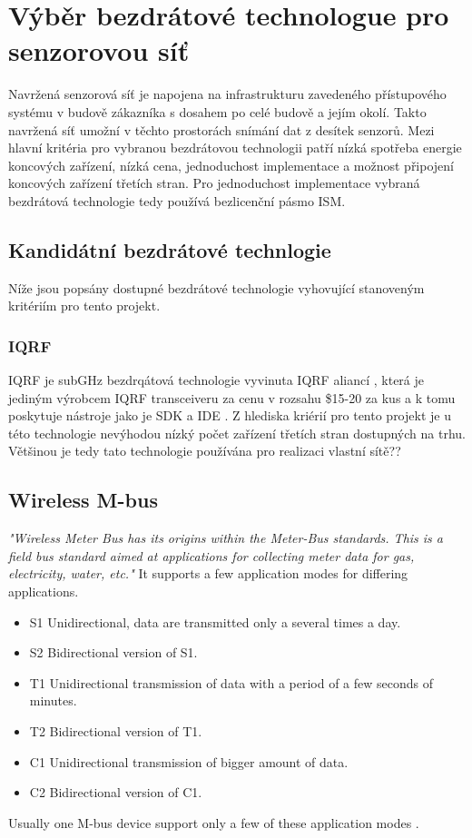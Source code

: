 \chapter{Výběr bezdrátové technologue pro senzorovou síť}
Navržená senzorová síť je napojena na infrastrukturu zavedeného přístupového systému v budově zákazníka s dosahem po celé budově a jejím okolí. Takto navržená síť umožní v těchto prostorách snímání dat z desítek senzorů.
Mezi hlavní kritéria pro vybranou bezdrátovou technologii patří nízká spotřeba energie koncových zařízení, nízká cena, jednoduchost implementace a možnost připojení koncových zařízení třetích stran.
Pro jednoduchost implementace vybraná bezdrátová technologie tedy používá bezlicenční pásmo ISM. 

\section{Kandidátní bezdrátové technlogie}
Níže jsou popsány dostupné bezdrátové technologie vyhovující stanoveným kritériím pro tento projekt.

\subsection{IQRF}
IQRF je subGHz bezdrqátová technologie vyvinuta IQRF aliancí \cite{iqrf_alliance}, která je jediným výrobcem IQRF transceiveru \cite{iqrf_transceivers} za cenu v rozsahu \$15-20 za kus a k tomu poskytuje nástroje jako je SDK \cite{iqrf_sdk} a IDE \cite{iqrf_ide}. Z hlediska kriérií pro tento projekt je u této technologie nevýhodou nízký počet zařízení třetích stran dostupných na trhu. Většinou je tedy tato technologie používána pro realizaci vlastní sítě??


\section{Wireless M-bus}
\textit{"Wireless Meter Bus has its origins within the Meter-Bus standards. This is a field bus standard aimed at applications for collecting meter data for gas, electricity, water, etc."} \cite{5}
It supports a few application modes for differing applications.
\begin{itemize}
  \item S1  Unidirectional, data are transmitted only a several times a day.
  \item S2	Bidirectional version of S1.
  \item	T1	Unidirectional transmission of data with a period of a few seconds of minutes.
  \item T2	Bidirectional version of T1.
  \item C1	Unidirectional transmission of bigger amount of data.
  \item C2	Bidirectional version of C1.
\end{itemize}
Usually one M-bus device support only a few of these application modes \cite{5} \cite{6} \cite{7} \cite{8}.


